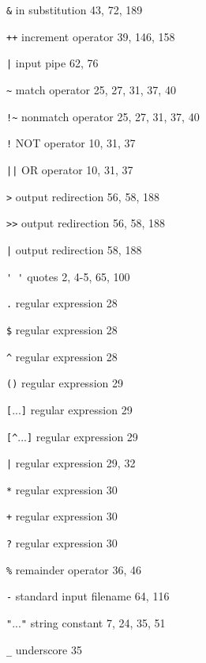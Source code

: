 \begin{multicols}{3}
\hangindent=3pc  \verb'&' in substitution 43, 72, 189

\hangindent=3pc  \verb'++' increment operator 39, 146, 158

\hangindent=3pc  \verb'|' input pipe 62, 76

\hangindent=3pc  \verb'~' match operator 25, 27, 31, 37, 40

\hangindent=3pc  \verb'!~' nonmatch operator 25, 27, 31, 37, 40

\hangindent=3pc  \verb'!' NOT operator 10, 31, 37

\hangindent=3pc  \verb'||' OR operator 10, 31, 37

\hangindent=3pc  \verb'>' output redirection 56, 58, 188

\hangindent=3pc  \verb'>>' output redirection 56, 58, 188

\hangindent=3pc  \verb'|' output redirection 58, 188

\hangindent=3pc  \verb"' '" quotes 2, 4-5, 65, 100

\hangindent=3pc  \verb'.' regular expression 28

\hangindent=3pc  \verb'$' regular expression 28

\hangindent=3pc  \verb'^' regular expression 28

\hangindent=3pc  \verb'()' regular expression 29

\hangindent=3pc  \verb'['...\verb']' regular expression 29

\hangindent=3pc  \verb'[^'...\verb']' regular expression 29

\hangindent=3pc  \verb'|' regular expression 29, 32

\hangindent=3pc  \verb'*' regular expression 30

\hangindent=3pc  \verb'+' regular expression 30

\hangindent=3pc  \verb'?' regular expression 30

\hangindent=3pc  \verb'%' remainder operator 36, 46

\hangindent=3pc  \verb'-' standard input filename 64, 116

\hangindent=3pc  \verb'"'...\verb'"' string constant 7, 24, 35, 51

\hangindent=3pc  \verb'_' underscore 35


\end{multicols}
